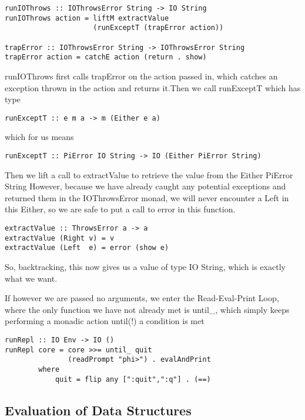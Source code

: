 \begin{verbatim}
runIOThrows :: IOThrowsError String -> IO String
runIOThrows action = liftM extractValue 
                     (runExceptT (trapError action))

trapError :: IOThrowsError String -> IOThrowsError String
trapError action = catchE action (return . show)
\end{verbatim}

runIOThrows first calls trapError on the action passed in, which catches an exception thrown in the action and returns it.Then we call runExceptT which has type

\begin{verbatim}
runExceptT :: e m a -> m (Either e a)
\end{verbatim}

which for us means

\begin{verbatim}
runExceptT :: PiError IO String -> IO (Either PiError String)
\end{verbatim}

Then we lift a call to extractValue to retrieve the value from the Either PiError String
However, because we have already caught any potential exceptions and returned them in the IOThrowsError monad, we will never encounter a Left in this Either, so we are safe to put a call to error in this function. 

\begin{verbatim}
extractValue :: ThrowsError a -> a 
extractValue (Right v) = v
extractValue (Left  e) = error (show e)
\end{verbatim}

So, backtracking, this now gives us a value of type IO String, which is exactly what we want. 

If however we are passed no arguments, we enter the Read-Eval-Print Loop, where the only function we have not already met is until_, which simply keeps performing a monadic action until(!) a condition is met

\begin{verbatim}
runRepl :: IO Env -> IO ()
runRepl core = core >>= until_ quit 
               (readPrompt "phi>") . evalAndPrint
        where
            quit = flip any [":quit",":q"] . (==)
\end{verbatim}

\subsection{Evaluation of Data Structures}
\label{sec:eval}

